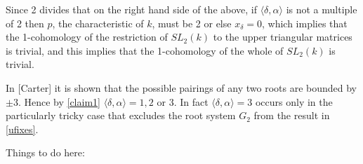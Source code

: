 Since 2 divides that on the right hand side of the above, if $\langle \delta, \alpha \rangle$ is not a multiple of 2 then $p$, the characteristic of $k$, must be 2 or else $x_\delta = 0$, which implies that the 1-cohomology of the restriction of $SL_2(k)$ to the upper triangular matrices is trivial, and this implies that the 1-cohomology of the whole of $SL_2(k)$ is trivial.

In [Carter] it is shown that the possible pairings of any two roots are bounded by $\pm 3$. Hence by \ref{claim1} $\langle \delta, \alpha \rangle = 1, 2$ or 3. In fact $\langle \delta, \alpha \rangle = 3$ occurs only in the particularly tricky case that excludes the root system $G_2$ from the result in \ref{ufixes}.

Things to do here:

